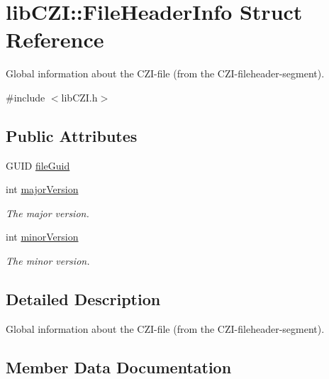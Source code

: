\hypertarget{structlib_c_z_i_1_1_file_header_info}{}\section{lib\+C\+ZI\+:\+:File\+Header\+Info Struct Reference}
\label{structlib_c_z_i_1_1_file_header_info}


Global information about the C\+Z\+I-\/file (from the C\+Z\+I-\/fileheader-\/segment).  




{\ttfamily \#include $<$lib\+C\+Z\+I.\+h$>$}

\subsection*{Public Attributes}
\begin{DoxyCompactItemize}
\item 
G\+U\+ID \hyperlink{structlib_c_z_i_1_1_file_header_info_a942aed4fd5aeac0bb419a72171386948}{file\+Guid}
\item 
\mbox{\label{structlib_c_z_i_1_1_file_header_info_a692d1f6f9cff6bc6ddfc127b69c62f15}} 
int \hyperlink{structlib_c_z_i_1_1_file_header_info_a692d1f6f9cff6bc6ddfc127b69c62f15}{major\+Version}
\begin{DoxyCompactList}\small\item\em The major version. \end{DoxyCompactList}\item 
\mbox{\label{structlib_c_z_i_1_1_file_header_info_ace24be72c65a361c42b53de097cb6984}} 
int \hyperlink{structlib_c_z_i_1_1_file_header_info_ace24be72c65a361c42b53de097cb6984}{minor\+Version}
\begin{DoxyCompactList}\small\item\em The minor version. \end{DoxyCompactList}\end{DoxyCompactItemize}


\subsection{Detailed Description}
Global information about the C\+Z\+I-\/file (from the C\+Z\+I-\/fileheader-\/segment). 

\subsection{Member Data Documentation}
\mbox{\label{structlib_c_z_i_1_1_file_header_info_a942aed4fd5aeac0bb419a72171386948}} 
